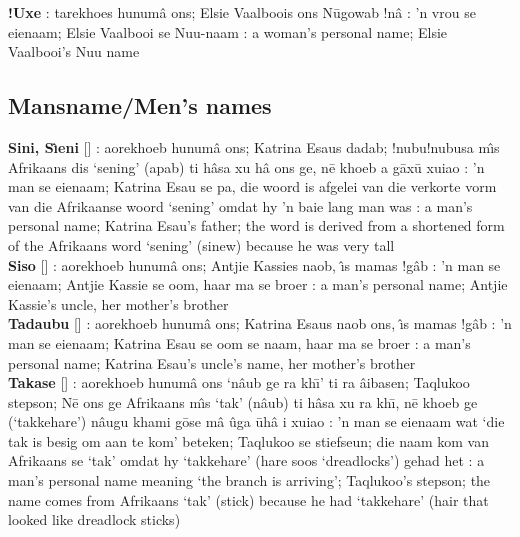 \textbf{!Uxe} : tarekhoes
\textdoublebarpipe{}hunum\^{a} \textvertline{}ons; Elsie Vaalboois
\textvertline{}ons \textvertline{}N\={u}gowab !n\^{a} :
'n vrou se eienaam; Elsie Vaalbooi se N\textvertline{}uu-naam
: a woman's personal name; Elsie Vaalbooi's
N\textvertline{}uu name


\markboth{}{}
\subsection*{Mansname/Men's names}
\markboth{}{}

\textbf{Sini, S\^{\i}eni} []
: aorekhoeb \textdoublebarpipe{}hunum\^{a}
\textvertline{}ons; Katrina Esaus dadab; !nubu!nubusa m\^{\i}s
Afrikaans dis `sening' (\textdoublevertline{}apab) ti h\^{a}sa xu
h\^{a} \textvertline{}ons ge, n\={e} khoeb a g\={a}x\={u} xuiao
: 'n man se eienaam; Katrina Esau se pa, die woord is
afgelei van die verkorte vorm van die Afrikaanse woord `sening' omdat
hy 'n baie lang man was : a man's personal name; Katrina
Esau's father; the word is derived from a shortened form of the
Afrikaans word `sening' (sinew) because he was very tall \\

\textbf{Siso} [] : aorekhoeb
\textdoublebarpipe{}hunum\^{a} \textvertline{}ons; Antjie Kassies
\textdoublevertline{}naob, \textdoublevertline{}\^{\i}s mamas !g\^{a}b
: 'n man se eienaam; Antjie Kassie se oom, haar ma se
broer : a man's personal name; Antjie Kassie's uncle,
her mother's brother \\

\textbf{Tadaubu} [] : aorekhoeb
\textdoublebarpipe{}hunum\^{a} \textvertline{}ons; Katrina Esaus
\textdoublevertline{}naob \textvertline{}ons, 
\textdoublevertline{}\^{\i}s mamas !g\^{a}b
: 'n man se eienaam; Katrina Esau se oom se naam, haar
ma se broer : a man's personal name; Katrina Esau's
uncle's name, her mother's brother \\

\textbf{Takase} [] : aorekhoeb
\textdoublebarpipe{}hunum\^{a} \textvertline{}ons
`\textdoublevertline{}n\^{a}ub ge ra \textvertline{}kh\={\i}' ti ra
\textdoublebarpipe{}\^{a}ibasen; Taqlukoo stepson; N\={e}
\textvertline{}ons ge Afrikaans m\^{\i}s `tak'
(\textdoublevertline{}n\^{a}ub) ti h\^{a}sa xu ra
\textvertline{}kh\={\i}, n\={e} khoeb ge (`takkehare')
\textdoublevertline{}n\^{a}ugu khami \textdoublebarpipe{}g\={o}se
m\^{a} \textvertline{}\^{u}ga \={u}h\^{a} i xuiao : 'n
man se eienaam wat `die tak is besig om aan te kom' beteken; Taqlukoo
se stiefseun; die naam kom van Afrikaans se `tak' omdat hy `takkehare'
(hare soos `dreadlocks') gehad het : a man's personal
name meaning `the branch is arriving'; Taqlukoo's stepson; the name
comes from Afrikaans `tak' (stick) because he had `takkehare' (hair
that looked like dreadlock sticks) \\

